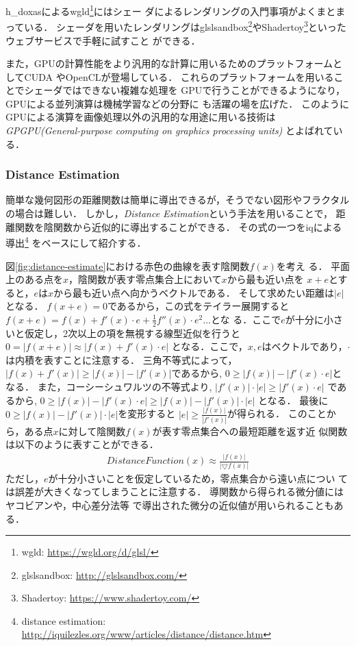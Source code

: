 h\_doxasによるwgld\footnote{wgld: \url{https://wgld.org/d/glsl/}}にはシェー
ダによるレンダリングの入門事項がよくまとまっている．
シェーダを用いたレンダリングはglslsandbox\footnote{glslsandbox:
\url{http://glslsandbox.com/}}やShadertoy\footnote{Shadertoy:
\url{https://www.shadertoy.com/}}といったウェブサービスで手軽に試すこと
ができる．

また，GPUの計算性能をより汎用的な計算に用いるためのプラットフォームとしてCUDA
やOpenCLが登場している．
これらのプラットフォームを用いることでシェーダではできない複雑な処理を
GPUで行うことができるようになり，GPUによる並列演算は機械学習などの分野に
も活躍の場を広げた．
このようにGPUによる演算を画像処理以外の汎用的な用途に用いる技術は
\textit{GPGPU(General-purpose computing on graphics processing units)}
とよばれている．

\subsubsection{Distance Estimation}

簡単な幾何図形の距離関数は簡単に導出できるが，そうでない図形やフラクタル
の場合は難しい．
しかし，\textit{Distance Estimation}という手法を用いることで，
距離関数を陰関数から近似的に導出することができる．
その式の一つをiqによる導出\footnote{distance estimation:
\url{http://iquilezles.org/www/articles/distance/distance.htm}}
をベースにして紹介する．

図\ref{fig:distance-estimate}における赤色の曲線を表す陰関数$f(x)$を考え
る．
平面上のある点を$x$，陰関数が表す零点集合上において$x$から最も近い点を
$x + e$とすると，$e$は$x$から最も近い点へ向かうベクトルである．
そして求めたい距離は$|e|$となる．
$f(x + e) = 0$であるから，この式をテイラー展開すると
$f(x + e) = f(x) + f'(x) \cdot e  + \frac{1}{2}f''(x) \cdot e^2 ...$とな
る．ここで$e$が十分に小さいと仮定し，2次以上の項を無視する線型近似を行うと
$0=|f(x + e)| \approx |f(x) + f'(x) \cdot e|$
となる．ここで，$x, e$はベクトルであり，$\cdot$は内積を表すことに注意する．
三角不等式によって，$| f(x) + f'(x) | \geq |f(x)| - |f'(x)|$であるから,
$0 \geq |f(x)| - |f'(x) \cdot e|$となる．
また，コーシーシュワルツの不等式より,
$|f'(x)| \cdot |e| \geq | f'(x)\cdot e|$
であるから,
$0 \geq |f(x)| - |f'(x) \cdot e| \geq |f(x)| - |f'(x)| \cdot |e|$
となる．
最後に$0 \geq |f(x)| - |f'(x)| \cdot |e|$を変形すると
$|e| \geq \frac{|f(x)|}{|f'(x)|}$が得られる．
このことから，ある点$x$に対して陰関数$f(x)$が表す零点集合への最短距離を返す近
似関数は以下のように表すことができる．
\begin{align*}
 DistanceFunction(x) \approx \frac{|f(x)|}{|\bigtriangledown f(x)|}
\end{align*}
ただし，$e$が十分小さいことを仮定しているため，零点集合から遠い点につい
ては誤差が大きくなってしまうことに注意する．
導関数から得られる微分値にはヤコビアンや，中心差分法等
で導出された微分の近似値が用いられることもある．

